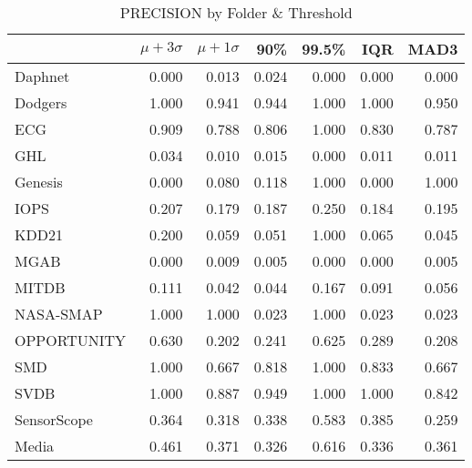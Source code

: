 \begin{table}
\caption{PRECISION by Folder \& Threshold}
\label{tab:precision_by_folder}
\begin{tabular}{lrrrrrr}
\toprule
 & $\mu + 3\sigma$ & $\mu + 1\sigma$ & 90\% & 99.5\% & IQR & MAD3 \\
\midrule
Daphnet & 0.000 & 0.013 & 0.024 & 0.000 & 0.000 & 0.000 \\
Dodgers & 1.000 & 0.941 & 0.944 & 1.000 & 1.000 & 0.950 \\
ECG & 0.909 & 0.788 & 0.806 & 1.000 & 0.830 & 0.787 \\
GHL & 0.034 & 0.010 & 0.015 & 0.000 & 0.011 & 0.011 \\
Genesis & 0.000 & 0.080 & 0.118 & 1.000 & 0.000 & 1.000 \\
IOPS & 0.207 & 0.179 & 0.187 & 0.250 & 0.184 & 0.195 \\
KDD21 & 0.200 & 0.059 & 0.051 & 1.000 & 0.065 & 0.045 \\
MGAB & 0.000 & 0.009 & 0.005 & 0.000 & 0.000 & 0.005 \\
MITDB & 0.111 & 0.042 & 0.044 & 0.167 & 0.091 & 0.056 \\
NASA-SMAP & 1.000 & 1.000 & 0.023 & 1.000 & 0.023 & 0.023 \\
OPPORTUNITY & 0.630 & 0.202 & 0.241 & 0.625 & 0.289 & 0.208 \\
SMD & 1.000 & 0.667 & 0.818 & 1.000 & 0.833 & 0.667 \\
SVDB & 1.000 & 0.887 & 0.949 & 1.000 & 1.000 & 0.842 \\
SensorScope & 0.364 & 0.318 & 0.338 & 0.583 & 0.385 & 0.259 \\
Media & 0.461 & 0.371 & 0.326 & 0.616 & 0.336 & 0.361 \\
\bottomrule
\end{tabular}
\end{table}
